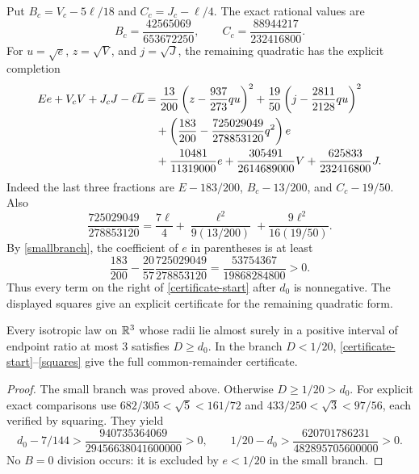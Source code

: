 Put $B_c=V_c-5\ell/18$ and $C_c=J_c-\ell/4$. The exact rational values are
\[
 B_c=\frac{42565069}{653672250},\qquad
 C_c=\frac{88944217}{232416800}.
\]
For $u=\sqrt e$, $z=\sqrt V$, and $j=\sqrt J$, the remaining quadratic has
the explicit completion
\begin{align}\label{squares}
 E e+V_c V+J_c J-\ell\overline L
 &=\frac{13}{200}\left(z-\frac{937}{273}qu\right)^2
   +\frac{19}{50}\left(j-\frac{2811}{2128}qu\right)^2\notag\\
 &\quad+\left(\frac{183}{200}-\frac{725029049}{278853120}q^2\right)e\notag\\
 &\quad+\frac{10481}{11319000}e
        +\frac{305491}{2614689000}V+\frac{625833}{232416800}J.
\end{align}
Indeed the last three fractions are $E-183/200$, $B_c-13/200$,
and $C_c-19/50$. Also
\[
 \frac{725029049}{278853120}
  =\frac{7\ell}{4}+\frac{\ell^2}{9(13/200)}
                          +\frac{9\ell^2}{16(19/50)}.
\]
By \eqref{smallbranch}, the coefficient of $e$ in parentheses is at least
\[
 \frac{183}{200}-\frac{20}{57}\frac{725029049}{278853120}
                         =\frac{53754367}{19868284800}>0.
\]
Thus every term on the right of \eqref{certificate-start} after $d_0$
is nonnegative. The displayed squares give an explicit certificate for the remaining
quadratic form.

\begin{proposition}\label{conditional-law}
Every isotropic law on $\mathbb R^3$ whose radii lie almost surely in a positive
interval of endpoint ratio at most $3$ satisfies $D\ge d_0$.
In the branch $D<1/20$, \eqref{certificate-start}--\eqref{squares}
give the full common-remainder certificate.
\end{proposition}
\begin{proof}
The small branch was proved above. Otherwise $D\ge1/20>d_0$.
For explicit exact comparisons use
$682/305<\sqrt5<161/72$ and $433/250<\sqrt3<97/56$,
each verified by squaring. They yield
\[
 d_0-7/144>\frac{940735364069}{29456638041600000}>0,\qquad
 1/20-d_0>\frac{620701786231}{482895705600000}>0.
\]
No $B=0$ division occurs: it is excluded by $e<1/20$ in the small branch.
\end{proof}
